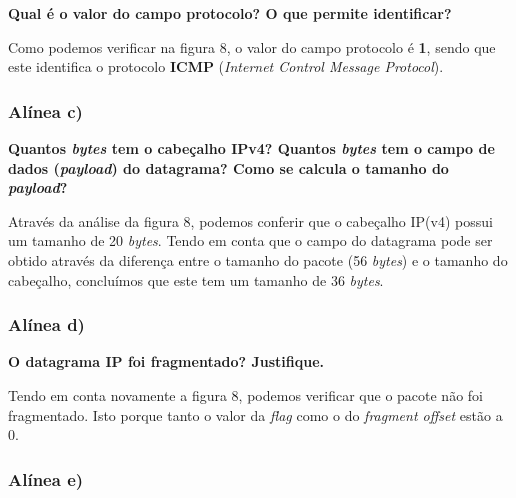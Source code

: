 \documentclass{article}
\begin{document}
\textbf{Qual é o valor do campo protocolo? O que permite identificar?}\par\vspace{0.35cm}
\hspace{0.5cm}Como podemos verificar na figura 8, o valor do campo protocolo é \textbf{1}, sendo que este identifica o protocolo \textbf{ICMP} (\emph{Internet Control Message Protocol}).

\subsubsection{Alínea c)}

\textbf{Quantos \emph{bytes} tem o cabeçalho IPv4? Quantos \emph{bytes} tem o campo de dados (\emph{payload}) do datagrama? Como se calcula o tamanho do \emph{payload}?}\par\vspace{0.35cm}
\hspace{0.5cm}Através da análise da figura 8, podemos conferir que o cabeçalho IP(v4) possui um tamanho de 20 \emph{bytes}. Tendo em conta que o campo do datagrama pode ser obtido através da diferença entre o tamanho do pacote (56 \emph{bytes}) e o tamanho do cabeçalho, concluímos que este tem um tamanho de 36 \emph{bytes}.\vspace{0.25cm}

\subsubsection{Alínea d)}

\textbf{O datagrama IP foi fragmentado? Justifique.}\par\vspace{0.35cm}
\hspace{0.5cm}Tendo em conta novamente a figura 8, podemos verificar que o pacote não foi fragmentado. Isto porque tanto o valor da \emph{flag} como o do \emph{fragment offset} estão a 0.\vspace{0.35cm}

\subsubsection{Alínea e)}\vspace{0.1cm}
\end{document}
